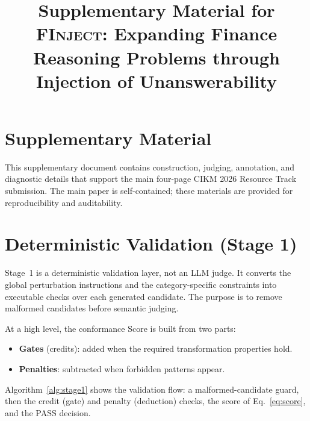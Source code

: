 \documentclass[10pt]{article}
\newcommand{\bench}{\textsc{FInject}\xspace}
\begin{document}
\title{Supplementary Material for \bench: Expanding Finance Reasoning Problems through Injection of Unanswerability}
\author{}
\date{}
\maketitle

\section*{Supplementary Material}

This supplementary document contains construction, judging, annotation, and diagnostic details that support the main four-page CIKM 2026 Resource Track submission. The main paper is self-contained; these materials are provided for reproducibility and auditability.

\setcounter{table}{0}
\setcounter{figure}{0}
\renewcommand{\thetable}{S\arabic{table}}
\renewcommand{\thefigure}{S\arabic{figure}}

\section{Deterministic Validation (Stage 1)}
\label{app:stage1}

Stage~1 is a deterministic validation layer, not an LLM judge. It converts the global perturbation instructions and the category-specific constraints into executable checks over each generated candidate. The purpose is to remove malformed candidates before semantic judging.

At a high level, the conformance Score is built from two parts:
\begin{itemize}
  \item \textbf{Gates} (credits): added when the required transformation properties hold.
  \item \textbf{Penalties}: subtracted when forbidden patterns appear.
\end{itemize}
Algorithm~\ref{alg:stage1} shows the validation flow: a malformed-candidate guard, then the credit (gate) and penalty (deduction) checks, the score of Eq.~\eqref{eq:score}, and the PASS decision.
\end{document}
